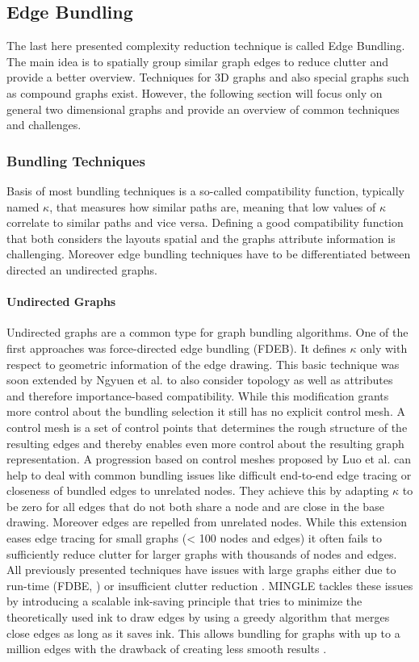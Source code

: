 \subsection{Edge Bundling}
The last here presented complexity reduction technique is called Edge Bundling. The main idea is to spatially group similar graph edges to reduce clutter and provide a better overview. Techniques for 3D graphs and also special graphs such as compound graphs exist. However, the following section will focus only on general two dimensional graphs and provide an overview of common techniques and challenges.

\subsubsection{Bundling Techniques}
Basis of most bundling techniques is a so-called compatibility function, typically named $\kappa$, that measures how similar paths are, meaning that low values of $\kappa$ correlate to similar paths and vice versa. Defining a good compatibility function that both considers the layouts spatial and the graphs attribute information is challenging. Moreover edge bundling techniques have to be differentiated between directed an undirected graphs\cite{Lhuillier2017}.

\paragraph*{Undirected Graphs} Undirected graphs are a common type for graph bundling algorithms. One of the first approaches was force-directed edge bundling (FDEB). It defines $\kappa$ only with respect to geometric information of the edge drawing. This basic technique was soon extended by Ngyuen et al. to also consider topology as well as attributes and therefore importance-based compatibility\cite{Nguyen2012}. While this modification grants more control about the bundling selection it still has no explicit control mesh. A control mesh is a set of control points that determines the rough structure of the resulting edges and thereby enables even more control about the resulting graph representation. A progression based on control meshes proposed by Luo et al. can help to deal with common bundling issues like difficult end-to-end edge tracing or closeness of bundled edges to unrelated nodes. They achieve this by adapting $\kappa$ to be zero for all edges that do not both share a node and are close in the base drawing. Moreover edges are repelled from unrelated nodes\cite{Luo2012}. While this extension eases edge tracing for small graphs (< 100 nodes and edges) it often fails to sufficiently reduce clutter for larger graphs with thousands of nodes and edges.\\
All previously presented techniques have issues with large graphs either due to run-time (FDBE, \cite{Nguyen2012}) or insufficient clutter reduction \cite{Luo2012}. MINGLE \cite{Gansner2011} tackles these issues by introducing a scalable ink-saving principle that tries to minimize the theoretically used ink to draw edges by using a greedy algorithm that merges close edges as long as it saves ink. This allows bundling for graphs with up to a million edges with the drawback of creating less smooth results \cite{Lhuillier2017}. 

